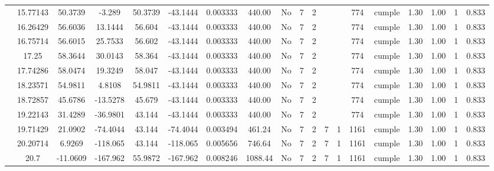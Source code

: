 \begin{table}[H]
{\begin{tabular}{|c|c|c|c|c|c|r|c|c|c|c|c|c|c|c|c|c|c|c|}
\cline{2-19}    & 15.77143 & 50.3739 & -3.289 & 50.3739 & -43.1444 & \multicolumn{1}{c|}{0.003333} & 440.00 & No  & 7   & 2   &     &     & 774 & \cellcolor[rgb]{ .776,  .937,  .808}\textcolor[rgb]{ 0,  .38,  0}{cumple} & 1.30 & 1.00 & 1   & 0.833 \bigstrut\\
\cline{2-19}    & 16.26429 & 56.6036 & 13.1444 & 56.604 & -43.1444 & 0.003333 & 440.00 & No  & 7   & 2   &     &     & 774 & \cellcolor[rgb]{ .776,  .937,  .808}cumple & 1.30 & 1.00 & 1   & 0.833 \bigstrut\\
\cline{2-19}    & 16.75714 & 56.6015 & 25.7533 & 56.602 & -43.1444 & 0.003333 & 440.00 & No  & 7   & 2   &     &     & 774 & \cellcolor[rgb]{ .776,  .937,  .808}cumple & 1.30 & 1.00 & 1   & 0.833 \bigstrut\\
\cline{2-19}    & 17.25 & 58.3644 & 30.0143 & 58.364 & -43.1444 & 0.003333 & 440.00 & No  & 7   & 2   &     &     & 774 & \cellcolor[rgb]{ .776,  .937,  .808}cumple & 1.30 & 1.00 & 1   & 0.833 \bigstrut\\
\cline{2-19}    & 17.74286 & 58.0474 & 19.3249 & 58.047 & -43.1444 & 0.003333 & 440.00 & No  & 7   & 2   &     &     & 774 & \cellcolor[rgb]{ .776,  .937,  .808}cumple & 1.30 & 1.00 & 1   & 0.833 \bigstrut\\
\cline{2-19}    & 18.23571 & 54.9811 & 4.8108 & 54.9811 & -43.1444 & \multicolumn{1}{c|}{0.003333} & 440.00 & No  & 7   & 2   &     &     & 774 & \cellcolor[rgb]{ .776,  .937,  .808}\textcolor[rgb]{ 0,  .38,  0}{cumple} & 1.30 & 1.00 & 1   & 0.833 \bigstrut\\
\cline{2-19}    & 18.72857 & 45.6786 & -13.5278 & 45.679 & -43.1444 & 0.003333 & 440.00 & No  & 7   & 2   &     &     & 774 & \cellcolor[rgb]{ .776,  .937,  .808}cumple & 1.30 & 1.00 & 1   & 0.833 \bigstrut\\
\cline{2-19}    & 19.22143 & 31.4289 & -36.9801 & 43.144 & -43.1444 & 0.003333 & 440.00 & No  & 7   & 2   &     &     & 774 & \cellcolor[rgb]{ .776,  .937,  .808}cumple & 1.30 & 1.00 & 1   & 0.833 \bigstrut\\
\cline{2-19}    & 19.71429 & 21.0902 & -74.4044 & 43.144 & -74.4044 & 0.003494 & 461.24 & No  & 7   & 2   & 7   & 1   & 1161 & \cellcolor[rgb]{ .776,  .937,  .808}cumple & 1.30 & 1.00 & 1   & 0.833 \bigstrut\\
\cline{2-19}    & 20.20714 & 6.9269 & -118.065 & 43.144 & -118.065 & 0.005656 & 746.64 & No  & 7   & 2   & 7   & 1   & 1161 & \cellcolor[rgb]{ .776,  .937,  .808}cumple & 1.30 & 1.00 & 1   & 0.833 \bigstrut\\
\cline{2-19}    & 20.7 & -11.0609 & -167.962 & 55.9872 & -167.962 & \multicolumn{1}{c|}{0.008246} & 1088.44 & No  & 7   & 2   & 7   & 1   & 1161 & \cellcolor[rgb]{ .776,  .937,  .808}\textcolor[rgb]{ 0,  .38,  0}{cumple} & 1.30 & 1.00 & 1   & 0.833 \bigstrut\\

\end{tabular}}
\end{table}
